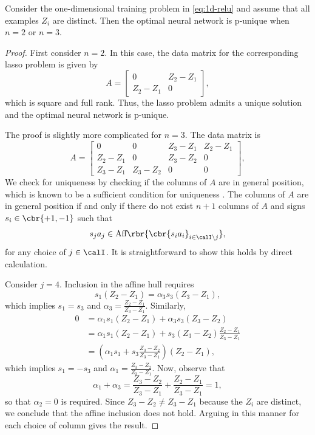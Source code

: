\begin{lemma}
	Consider the one-dimensional training problem in \cref{eq:1d-relu}
	and assume that all examples \( Z_i \) are distinct.
	Then the optimal neural network is p-unique when \( n = 2 \) or \( n = 3 \).
\end{lemma}
\begin{proof}
	First consider \( n = 2 \).
	In this case, the data matrix for the corresponding lasso problem is given
	by
	\[
		A =
		\begin{bmatrix}
			0         & Z_2 - Z_1 \\
			Z_2 - Z_1 & 0
		\end{bmatrix},
	\]
	which is square and full rank. Thus, the lasso problem admits a unique
	solution and the optimal neural network is p-unique.

	The proof is slightly more complicated for \( n = 3 \).
	The data matrix is
	\[
		A =
		\begin{bmatrix}
			0         & 0         & Z_3 - Z_1 & Z_2 - Z_1 \\
			Z_2 - Z_1 & 0         & Z_3 - Z_2 & 0         \\
			Z_3 - Z_1 & Z_3 - Z_2 & 0         & 0
		\end{bmatrix},
	\]
	We check for uniqueness by checking if the columns of \( A \) are in
	general position, which is known to be a sufficient condition for
	uniqueness \citep{tibshirani2013unique}.
	The columns of \( A \) are in general position if and only if
	there do not exist \( n+1 \) columns of \( A \)
	and signs \( s_i \in \cbr{+1, -1} \) such that
	\[
		s_j a_j \in \text{Aff} \rbr{\cbr{s_i a_i}_{i \in \calI \setminus j}},
	\]
	for any choice of \( j \in \calI \).
	It is straightforward to show this holds by direct calculation.

	Consider \( j = 4 \).
	Inclusion in the affine hull requires
	\[
		s_1 (Z_2 - Z_1) = \alpha_3 s_3 (Z_3 - Z_1),
	\]
	which implies \( s_1 = s_3 \) and \( \alpha_3 = \frac{Z_2 - Z_1}{Z_3 - Z_1} \).
	Similarly,
	\begin{align*}
		0
		 & = \alpha_1 s_1 (Z_2 - Z_1) + \alpha_3 s_3 (Z_3 - Z_2)                    \\
		 & = \alpha_1 s_1 (Z_2 - Z_1) + s_3 (Z_3 - Z_2) \frac{Z_2 - Z_1}{Z_3 - Z_1} \\
		 & = (\alpha_1 s_1 + s_3 \frac{Z_3 - Z_2}{Z_3 - Z_1}) (Z_2 - Z_1),
	\end{align*}
	which implies \( s_1 = - s_3 \) and \( \alpha_1 = \frac{Z_3 - Z_2}{Z_3 - Z_1} \).
	Now, observe that
	\[
		\alpha_1 + \alpha_3 = \frac{Z_3 - Z_2}{Z_3 - Z_1} + \frac{Z_2 - Z_1}{Z_3 - Z_1} = 1,
	\]
	so that \( \alpha_2 = 0 \) is required.
	Since \( Z_3 - Z_2 \neq Z_3 - Z_1 \) because the \( Z_i \) are distinct,
	we conclude that the affine inclusion does not hold.
	Arguing in this manner for each choice of column gives the result.
\end{proof}

